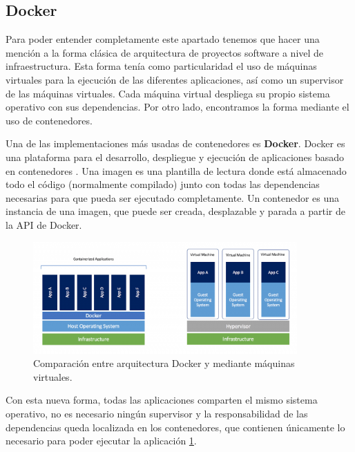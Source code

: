 \subsection{Docker}
Para poder entender completamente este apartado tenemos que hacer una mención a 
la forma clásica de arquitectura de proyectos software a nivel de infraestructura. Esta 
forma tenía como particularidad el uso de máquinas virtuales para la ejecución de las 
diferentes aplicaciones, así como un supervisor de las máquinas virtuales.  Cada 
máquina virtual despliega su propio sistema operativo con sus dependencias. Por otro 
lado, encontramos la forma mediante el uso de contenedores.

Una de las implementaciones más usadas de contenedores es \textbf{Docker}. Docker 
es una plataforma para el desarrollo, despliegue y ejecución de aplicaciones basado en 
contenedores \cite{Docker01}.  Una imagen es una plantilla de lectura donde está 
almacenado todo el código (normalmente compilado) junto con todas las dependencias 
necesarias para que pueda ser ejecutado completamente. Un contenedor es una 
instancia de una imagen, que puede ser creada, desplazable y parada a partir de la 
\ac{API} de Docker.

\begin{figure}[!htb]
\begin{center}
\includegraphics[width=0.9\textwidth]{./Imagenes/DockerComparision.png}
\caption{Comparación entre arquitectura Docker y mediante máquinas virtuales. 
\cite{Docker02}}
\label{figure:DockerComparision}
\end{center}
\end{figure}

Con esta nueva forma, todas las aplicaciones comparten el mismo sistema operativo, 
no es necesario ningún supervisor y la responsabilidad de las dependencias queda 
localizada en los contenedores, que contienen únicamente lo necesario para poder 
ejecutar la aplicación \ref{figure:DockerComparision}.

